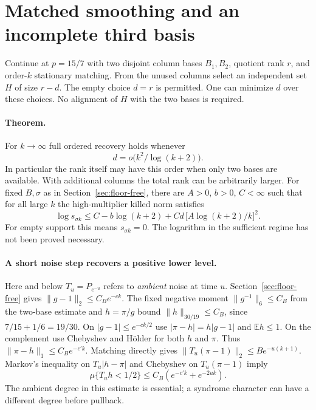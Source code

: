 \section{Matched smoothing and an incomplete third basis}
\label{sec:matched-defect}
Continue at $p=15/7$ with two disjoint column bases $B_1,B_2$, quotient rank $r$, and order-$k$ stationary matching. From the unused columns select an independent set $H$ of size $r-d$. The empty choice $d=r$ is permitted. One can minimize $d$ over these choices. No alignment of $H$ with the two bases is required.

\paragraph{Theorem.}
For $k\to\infty$ full ordered recovery holds whenever
\[
                    d=o\big(k^2/\log(k+2)\big).                 \tag{M1}
\]
In particular the rank itself may have this order when only two bases are available. With additional columns the total rank can be arbitrarily larger. For fixed $B,\sigma$ as in Section~\ref{sec:floor-free}, there are $A>0$, $b>0$, $C<\infty$ such that for all large $k$ the high-multiplier killed norm satisfies
\[
 \log s_{\sigma k}\le C-b\log(k+2)+
        C d\,\big[A\log(k+2)/k\big]^2.                         \tag{M2}
\]
For empty support this means $s_{\sigma k}=0$. The logarithm in the sufficient regime has not been proved necessary.

\paragraph{A short noise step recovers a positive lower level.}
Here and below $T_u=P_{e^{-u}}$ refers to \emph{ambient} noise at time $u$. Section~\ref{sec:floor-free} gives $\|g-1\|_2\le C_B e^{-ck}$. The fixed negative moment $\|g^{-1}\|_6\le C_B$ from the two-base estimate and $h=\pi/g$ bound $\|h\|_{30/19}\le C_B$, since $7/15+1/6=19/30$. On $|g-1|\le e^{-ck/2}$ use $|\pi-h|=h|g-1|$ and $\mathbb E h\le1$. On the complement use Chebyshev and H\"older for both $h$ and $\pi$. Thus $\|\pi-h\|_1\le C_B e^{-c'k}$. Matching directly gives $\|T_u(\pi-1)\|_2\le B e^{-u(k+1)}$. Markov's inequality on $T_u|h-\pi|$ and Chebyshev on $T_u(\pi-1)$ imply
\[
 \mu\{T_u h<1/2\}\le C_B(e^{-c'k}+e^{-2uk}).                 \tag{M3}
\]
The ambient degree in this estimate is essential; a syndrome character can have a different degree before pullback.

